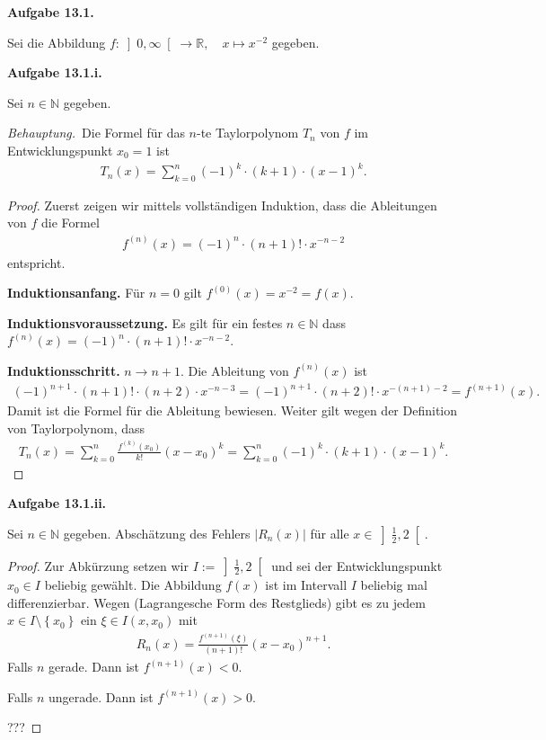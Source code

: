 \documentclass[draft,a5paper]{article}
\newcommand{\beh}{\textit{Behauptung.}\ }
\newcommand{\aufgn}[1]{\textbf{Aufgabe #1.}}
\newcommand{\mg}[1]{\mathbb{#1}}
\begin{document}
\aufgn{13.1}

Sei die Abbildung $f \colon \left]0, \infty \right[ \to
\mg{R}, \quad x \mapsto x^{-2}$ gegeben.

\aufgn{13.1.i}

Sei \(n \in \mg{N}\) gegeben.

\beh Die Formel für das \(n\)-te Taylorpolynom \(T_n\) von
\(f\) im Entwicklungspunkt \(x_0 = 1\) ist
\begin{align*}
T_n(x) = \sum_{k = 0}^n{(-1)^k \cdot (k+1) \cdot (x-1)^k}.
\end{align*}

\begin{proof}
Zuerst zeigen wir mittels vollständigen Induktion, dass
die Ableitungen von \(f\) die Formel
\begin{align*}
f^{(n)}(x) = (-1)^n \cdot (n+1)! \cdot x^{-n-2}
\end{align*}
entspricht.

\textbf{Induktionsanfang.} Für \(n = 0\) gilt $f^{(0)}(x)
= x^{-2} = f(x)$.

\textbf{Induktionsvoraussetzung.} Es gilt für ein festes
\(n \in \mg{N}\) dass \(f^{(n)}(x) = (-1)^n \cdot (n+1)! \cdot x^{-n-2}\).

\textbf{Induktionsschritt.} \(n \to n+1\).  Die Ableitung
von \(f^{(n)}(x)\) ist
\begin{align*}
(-1)^{n+1} \cdot (n+1)! \cdot
(n+2) \cdot x^{-n-3} = (-1)^{n+1} \cdot (n+2)! \cdot
x^{-(n+1) - 2} = f^{(n+1)}(x).
\end{align*}
Damit ist die Formel für die Ableitung bewiesen. Weiter
gilt wegen der Definition von Taylorpolynom, dass
\begin{align*}
T_n(x)= \sum_{k=0}^n{\frac{f^{(k)}(x_0)}{k!}(x -
  x_0)^k} = \sum_{k = 0}^n{(-1)^k \cdot (k+1) \cdot (x-1)^k}.
\end{align*}
\end{proof}

\aufgn{13.1.ii}

Sei \(n \in \mg{N}\) gegeben.  Abschätzung des Fehlers
\(\left| R_n(x) \right|\) für alle
\(x \in \left] \frac{1}{2}, 2 \right[\).

\begin{proof}
  Zur Abkürzung setzen wir
  \(I := \left] \frac{1}{2}, 2 \right[\) und sei der
  Entwicklungspunkt \(x_0 \in I\) beliebig gewählt. Die
  Abbildung \(f(x)\) ist im Intervall \(I\) beliebig mal
  differenzierbar.  Wegen (Lagrangesche Form des
  Restglieds) gibt es zu jedem $x \in I \setminus\left\{ x_0
  \right\}$ ein \(\xi \in I(x, x_0)\) mit
\begin{align*}
R_n(x) = \frac{f^{(n+1)}(\xi)}{(n+1)!}(x-x_0)^{n+1}.
\end{align*}
Falls \(n\) gerade.  Dann ist \(f^{(n+1)}(x) < 0\).

Falls \(n\) ungerade. Dann ist \(f^{(n+1)}(x) > 0\).

???
\end{proof}
\end{document}

